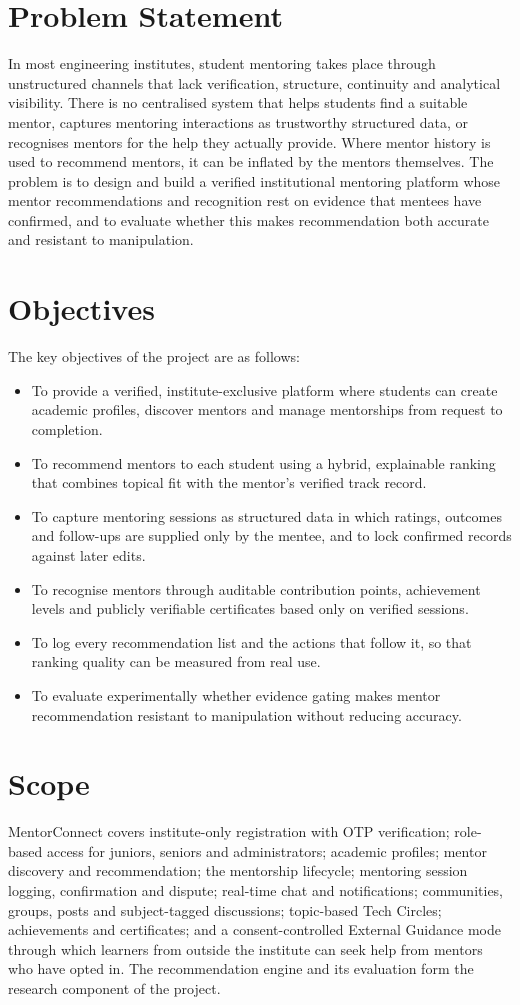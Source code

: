\documentclass[12pt,a4paper]{report}
\begin{document}
\section{Problem Statement}
In most engineering institutes, student mentoring takes place through unstructured channels that lack verification, structure, continuity and analytical visibility. There is no centralised system that helps students find a suitable mentor, captures mentoring interactions as trustworthy structured data, or recognises mentors for the help they actually provide. Where mentor history is used to recommend mentors, it can be inflated by the mentors themselves. The problem is to design and build a verified institutional mentoring platform whose mentor recommendations and recognition rest on evidence that mentees have confirmed, and to evaluate whether this makes recommendation both accurate and resistant to manipulation.

\section{Objectives}
The key objectives of the project are as follows:
\begin{itemize}
\item To provide a verified, institute-exclusive platform where students can create academic profiles, discover mentors and manage mentorships from request to completion.
\item To recommend mentors to each student using a hybrid, explainable ranking that combines topical fit with the mentor's verified track record.
\item To capture mentoring sessions as structured data in which ratings, outcomes and follow-ups are supplied only by the mentee, and to lock confirmed records against later edits.
\item To recognise mentors through auditable contribution points, achievement levels and publicly verifiable certificates based only on verified sessions.
\item To log every recommendation list and the actions that follow it, so that ranking quality can be measured from real use.
\item To evaluate experimentally whether evidence gating makes mentor recommendation resistant to manipulation without reducing accuracy.
\end{itemize}

\section{Scope}
MentorConnect covers institute-only registration with OTP verification; role-based access for juniors, seniors and administrators; academic profiles; mentor discovery and recommendation; the mentorship lifecycle; mentoring session logging, confirmation and dispute; real-time chat and notifications; communities, groups, posts and subject-tagged discussions; topic-based Tech Circles; achievements and certificates; and a consent-controlled External Guidance mode through which learners from outside the institute can seek help from mentors who have opted in. The recommendation engine and its evaluation form the research component of the project.
\end{document}
